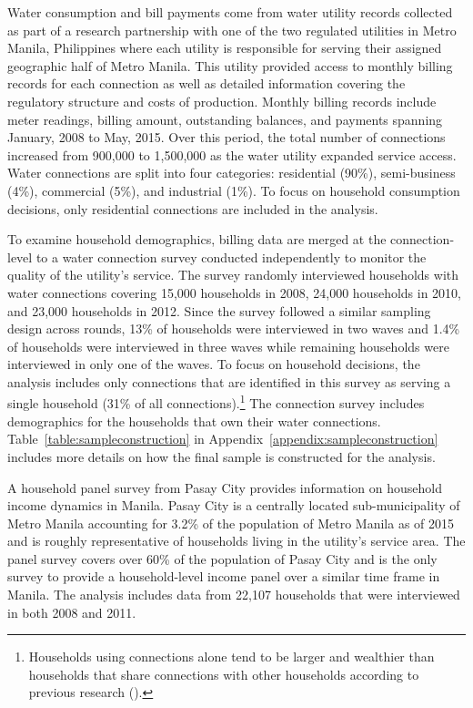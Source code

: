 \documentclass[12pt]{article}
\begin{document}
Water consumption and bill payments come from water utility records collected as part of a research partnership with one of the two regulated utilities in Metro Manila, Philippines where each utility is responsible for serving their assigned geographic half of Metro Manila.  This utility provided access to monthly billing records for each connection as well as detailed information covering the regulatory structure and costs of production.  Monthly billing records include meter readings, billing amount, outstanding balances, and payments spanning January, 2008 to May, 2015. Over this period, the total number of connections increased from 900,000 to 1,500,000 as the water utility expanded service access.  Water connections are split into four categories: residential (90\%), semi-business (4\%), commercial (5\%), and industrial (1\%).  To focus on household consumption decisions, only residential connections are included in the analysis.

To examine household demographics, billing data are merged at the connection-level to a water connection survey conducted independently to monitor the quality of the utility's service.  The survey randomly interviewed households with water connections covering 15,000 households in 2008, 24,000 households in 2010, and 23,000 households in 2012.  Since the survey followed a similar sampling design across rounds, 13\% of households were interviewed in two waves and 1.4\% of households were interviewed in three waves while remaining households were interviewed in only one of the waves.  To focus on household decisions, the analysis includes only connections that are identified in this survey as serving a single household (31\% of all connections).\footnote{Households using connections alone tend to be larger and wealthier than households that share connections with other households according to previous research (\cite{wjv}).}  The connection survey includes demographics for the households that own their water connections.  Table~\ref{table:sampleconstruction} in Appendix~\ref{appendix:sampleconstruction} includes more details on how the final sample is constructed for the analysis.

A household panel survey from Pasay City provides information on household income dynamics in Manila.  Pasay City is a centrally located sub-municipality of Metro Manila accounting for 3.2\% of the population of Metro Manila as of 2015 and is roughly representative of households living in the utility's service area.  The panel survey covers over 60\% of the population of Pasay City and is the only survey to provide a household-level income panel over a similar time frame in Manila.  The analysis includes data from 22,107 households that were interviewed in both 2008 and 2011.
\end{document}
